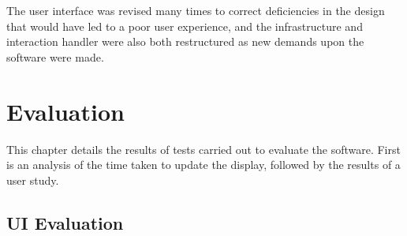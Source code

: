 \documentclass[12pt,twoside,notitlepage,xetex]{report}
\begin{document}
The user interface was revised many times to correct deficiencies in the design that would have led to a poor user experience, and the infrastructure and interaction handler were also both restructured as new demands upon the software were made.

\cleardoublepage
\chapter{Evaluation}

This chapter details the results of tests carried out to evaluate the software.  First is an analysis of the time taken to update the display, followed by the results of a user study.

%
%
\section{UI Evaluation}
\end{document}
